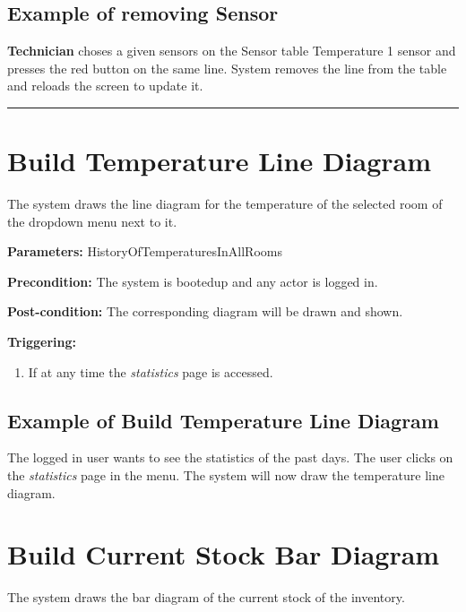 \subsection{Example of removing Sensor}
\textbf{Technician} choses a given sensors on the Sensor table Temperature 1
sensor and presses the red button on the same line.
System removes the line from the table and reloads the screen to update it.

 \hfill
\vspace{0.5cm}
\hrule



\break
\section{Build Temperature Line Diagram}
\label{operation:BuildTemperatureDiagram}
The system draws the line diagram for the temperature of the selected room of
the dropdown menu next to it.

\begin{description}

\item \textbf{Parameters:} HistoryOfTemperaturesInAllRooms
\item \textbf{Precondition:} The system is bootedup and any actor is logged in.
\item \textbf{Post-condition:} The corresponding diagram will be drawn and
shown.

\item \textbf{Triggering:}
\begin{enumerate}
\item If at any time the \emph{statistics} page is accessed.
\end{enumerate}
\end{description}

\subsection{Example of Build Temperature Line Diagram}
The logged in user wants to see the statistics of the past days.
The user clicks on the \emph{statistics} page in the menu.
The system will now draw the temperature line diagram.




\section{Build Current Stock Bar Diagram}
\label{operation:BuildCurrentStockDiagram}
The system draws the bar diagram of the current stock of the inventory.

